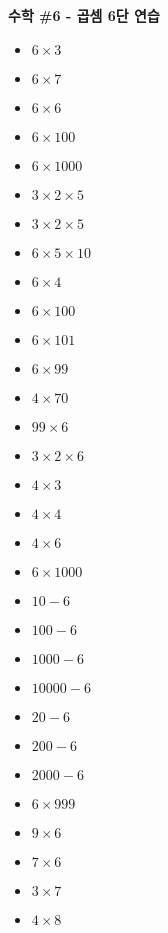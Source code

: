 \documentclass[a4paper,15pt]{exam}
\begin{document}
\fontsize{13pt}{24pt}\selectfont

\begin{center}
  \bfseries\LARGE
  수학 \#6 - 곱셈 6단 연습
  \bigskip
  \normalfont\normalsize
\end{center}

\begin{multicols}{2}
\begin{itemize}

\item $ 6 \times 3 $ 
\item $ 6 \times 7 $ 
\item $ 6 \times 6 $ 
\item $ 6 \times 100 $ 
\item $ 6 \times 1000 $ 
\item $ 3 \times 2 \times 5$ 
\item $ 3 \times 2 \times 5$ 
\item $ 6 \times 5 \times 10$
\item $ 6 \times 4 $ 
\item $ 6 \times 100 $
\item $ 6 \times 101 $
\item $ 6 \times 99 $
\item $ 4 \times 70 $
\item $ 99 \times 6 $
\item $ 3 \times 2 \times 6 $
\item $ 4 \times 3 $
\item $ 4 \times 4 $
\item $ 4 \times 6 $
\item $ 6 \times 1000 $
\item $ 10 - 6 $
\item $ 100 - 6 $
\item $ 1000 - 6 $
\item $ 10000 - 6 $
\item $ 20 - 6 $
\item $ 200 - 6 $
\item $ 2000 - 6 $
\item $ 6 \times 999 $
\item $ 9 \times 6 $
\item $ 7 \times 6 $
\item $ 3 \times 7 $
\item $ 4 \times 8 $

\end{itemize}
\end{multicols}

\newpage
\end{document}
